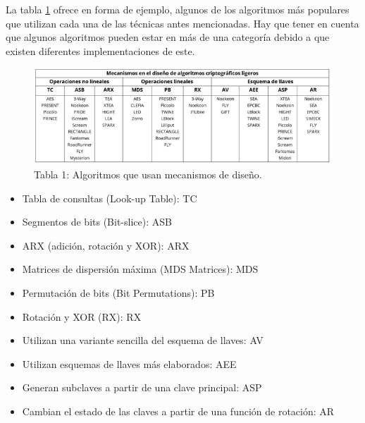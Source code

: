 \documentclass[a4paper,10pt]{article}
\begin{document}
	La tabla \ref{algoritmosCriptografiaLigera} ofrece en forma de ejemplo, algunos de los algoritmos más populares que utilizan cada una de las técnicas antes mencionadas. Hay que tener en cuenta que algunos algoritmos pueden estar en más de una categoría debido a que existen diferentes implementaciones de este.
		\begin{figure}[h]
		\centering
		\includegraphics[width=1.0\textwidth]{tablaAlgoritmosCriptografiaLigera.PNG}
		\caption{Tabla 1: Algoritmos que usan mecanismos de diseño.}
		\label{algoritmosCriptografiaLigera}
	\end{figure}\newline
	\begin{itemize}
		\item Tabla de consultas (Look-up Table): TC
		\item Segmentos de bits (Bit-slice): ASB
		\item ARX (adición, rotación y XOR): ARX
		\item Matrices de dispersión máxima (MDS Matrices): MDS
		\item Permutación de bits (Bit Permutations): PB
		\item Rotación y XOR (RX): RX
		\item Utilizan una variante sencilla del esquema de llaves: AV
		\item Utilizan esquemas de llaves más elaborados: AEE
		\item Generan subclaves a partir de una clave principal: ASP
		\item Cambian el estado de las claves a partir de una función de rotación: AR	
	\end{itemize}
	\newpage
\end{document}
